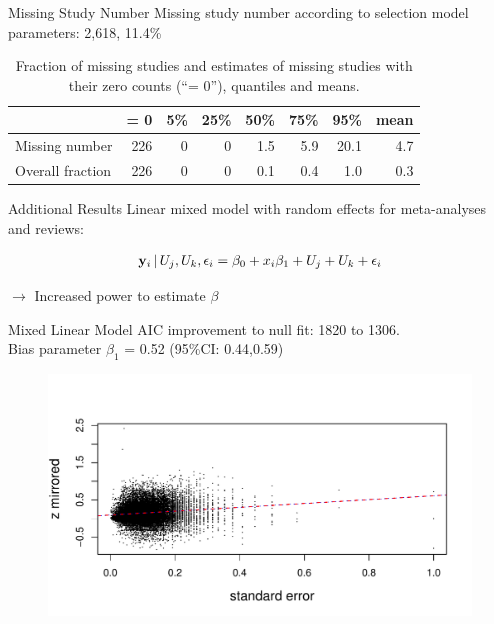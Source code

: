 \documentclass[english]{beamer}\usepackage[]{graphicx}\usepackage[]{color}
\makeatletter
\def\maxwidth{ %
  \ifdim\Gin@nat@width>\linewidth
    \linewidth
  \else
    \Gin@nat@width
  \fi
}
\newenvironment{knitrout}{}{} %
\makeatother
\begin{document}
\begin{frame}{Missing Study Number}
Missing study number according to selection model parameters: 2,618, 11.4\%


\begin{table}[ht]
\centering
\begingroup\footnotesize
\begin{tabular}{lrrrrrrr}
  \hline
 & = 0 & 5\% & 25\% & 50\% & 75\% & 95\% & mean \\ 
  \hline
Missing number & 226 & 0 & 0 & 1.5 & 5.9 & 20.1 & 4.7 \\ 
  Overall fraction & 226 & 0 & 0 & 0.1 & 0.4 & 1.0 & 0.3 \\ 
   \hline
\end{tabular}
\endgroup
\caption{Fraction of missing studies and estimates of missing studies with their zero counts (``= 0''), quantiles and means.} 
\label{copas.missing}
\end{table}

\end{frame}

\begin{frame}{Additional Results}
Linear mixed model with random effects for meta-analyses and reviews:

\begin{align}
\mathbf{y}_i \,\vert\, U_j,U_k,\epsilon_{i} =  \beta_0 + x_i\beta_1 + U_j + U_k + \epsilon_{i} \nonumber
\end{align}

$\rightarrow$ Increased power to estimate $\beta$
\end{frame}

\begin{frame}{Mixed Linear Model}
AIC improvement to null fit: 1820 to 1306. \\
Bias parameter $\beta_1$ = 0.52 (95\%CI: 0.44,0.59)

\vspace{-12mm}
\begin{figure}
\begin{knitrout}
\color{fgcolor}
\includegraphics[width=\maxwidth]{figure/unnamed-chunk-9-1} 

\end{knitrout}
\end{figure}
\end{frame}
\end{document}

